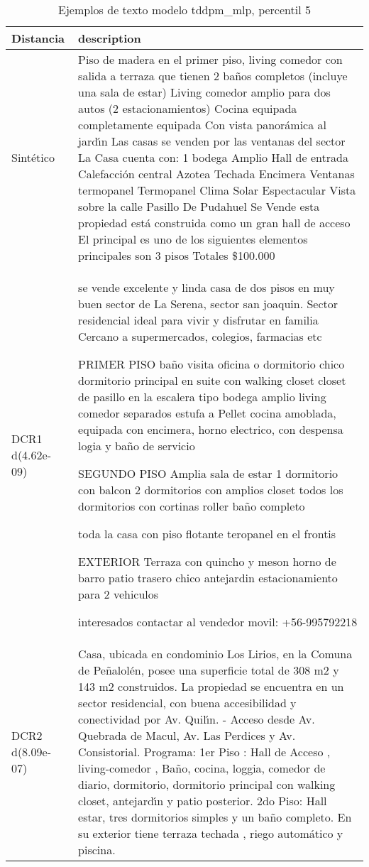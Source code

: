 \begin{table}[H]
\centering
\fontsize{10}{14}\selectfont
\caption{Ejemplos de texto modelo tddpm\_mlp, percentil 5}
\label{table-example-economicos-a-1-tddpm_mlp-5p-text}
\begin{tabular}{|l|m{35em}|}
\hline
\rowcolor[gray]{0.8}
Distancia & description \\
\hline Sintético & Piso de madera en el primer piso, living comedor con salida a terraza que tienen 2 ba\~nos completos (incluye una sala de estar) Living comedor amplio para dos autos (2 estacionamientos) Cocina equipada completamente equipada Con vista panor\'amica al jard{\'\i}n Las casas se venden por las ventanas del sector La Casa cuenta con: 1 bodega Amplio Hall de entrada Calefacci\'on central Azotea Techada Encimera Ventanas termopanel Termopanel Clima Solar Espectacular Vista sobre la calle Pasillo De Pudahuel Se Vende esta propiedad est\'a construida como un gran hall de acceso El principal es uno de los siguientes elementos principales son 3 pisos Totales \$100.000 \\
\hline DCR1 d(4.62e-09) & se vende excelente y linda casa de dos pisos
en muy buen sector de La Serena, sector san joaquin.
Sector residencial ideal para vivir y disfrutar en familia
Cercano a supermercados, colegios, farmacias etc

PRIMER PISO
ba\~no visita
oficina o dormitorio chico
dormitorio principal en suite con walking closet
closet de pasillo en la escalera tipo bodega
amplio living comedor separados
estufa a Pellet
cocina amoblada, equipada con encimera, horno electrico, con despensa 
logia y ba\~no de servicio

SEGUNDO PISO
Amplia sala de estar
1 dormitorio con balcon
2 dormitorios con amplios closet
todos los dormitorios con cortinas roller
ba\~no completo

toda la casa con piso flotante
teropanel en el frontis


EXTERIOR
Terraza con quincho y meson
horno de barro
patio trasero chico
antejardin
estacionamiento para 2 vehiculos

interesados contactar al vendedor
movil: +56-995792218 \\
\hline DCR2 d(8.09e-07) & Casa, ubicada en condominio Los Lirios, en la Comuna de Pe\~nalol\'en, posee una superficie total de 308 m2 y 143 m2 construidos.  La propiedad se encuentra en un sector residencial, con buena accesibilidad y conectividad por Av. Quil{\'\i}n.  - Acceso desde Av. Quebrada de Macul, Av. Las Perdices y Av. Consistorial.  Programa: 1er Piso : Hall de Acceso , living-comedor , Ba\~no, cocina, loggia, comedor de diario, dormitorio, dormitorio principal con walking closet, antejard{\'\i}n y patio posterior. 2do Piso: Hall estar, tres dormitorios simples y un ba\~no completo.  En su exterior tiene terraza techada , riego autom\'atico y piscina. \\
\hline
\end{tabular}
\end{table}
